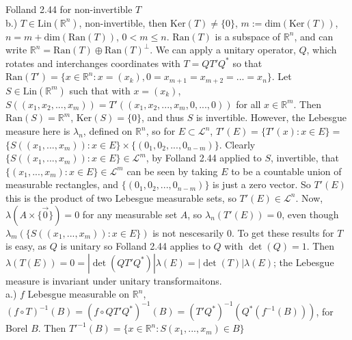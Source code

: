 \documentclass[12pt]{article}
\newcommand{\reals}[0] { \mathbb{R}}
\begin{document}
\begin{flushleft}
Folland 2.44 for non-invertible $T$ \\
b.) $T \in \textrm{Lin}(\reals^n)$, non-invertible, then $\textrm{Ker}(T) \not = \{ 0 \}$, $m := \textrm{dim}(\textrm{Ker}(T))$, $n = m + \textrm{dim}(\textrm{Ran}(T))$, $0 < m \le n$.
$\textrm{Ran}(T)$ is a subspace of $\reals^n$, and can write $\reals^n = \textrm{Ran}(T) \oplus \textrm{Ran}(T) ^ \perp$. We can apply a unitary operator, $Q$, which rotates and interchanges coordinates with $T = QT'Q^*$ so that  $\textrm{Ran}(T') = \{ x \in \reals^n: x= (x_k), 0 = x_{m+1} = x_{m+2} = ... = x_{n} \}$. Let $S \in \textrm{Lin}(\reals^m)$ such that with $x = (x_k)$, $S( (x_1, x_2, ..., x_m)) = T'(( x_1, x_2, ..., x_m, 0, ..., 0 ))$ for all $x \in \reals ^m$. Then $\textrm{Ran}(S) = \reals^m$, $\textrm{Ker}(S) = \{0 \} $, and thus $S$ is invertible. However, the Lebesgue measure here is $\lambda_n$, defined on $\reals^n$, so for $E \subset \mathcal{L}^n$, $T' (E ) =    \{ T'(x): x \in E \}  = $ $  \{ S( (x_1, ..., x_m) ): x \in E \} \times \{ (0_1, 0_2, ..., 0_{n-m})\}$. Clearly $ \{ S( (x_1, ..., x_m) ): x \in E \} \in \mathcal{L}^m$, by Folland 2.44 applied to $S$, invertible, that $ \{ (x_1, ..., x_m) : x \in E\} \in \mathcal{L}^m$ can be seen by taking $E$ to be a countable union of measurable rectangles, and $\{ (0_1, 0_2, ..., 0_{n-m})\}$ is just a zero vector. So $T'(E)$ this is the product of two Lebesgue measurable sets, so $T'(E) \in \mathcal{L}^n$. Now, $\lambda(A \times \{ \vec{0} \}) = 0$ for any measurable set $A$, so $\lambda_n(T'(E)) = 0$, even though $ \lambda_m( \{ S( (x_1, ..., x_m) ): x \in E \} )$ is not nescesarily 0. To get these results for $T$ is easy, as $Q$ is unitary so Folland 2.44 applies to $Q$ with $\det(Q)=1$. Then $ \lambda(T(E)) = 0 = |\det(QT'Q^*)| \lambda(E) = |\det(T)| \lambda(E)$; the Lebesgue measure is invariant under unitary transformaitons.\\
a.) $f$ Lebesgue measurable on $\reals^n$, $(f \circ T )^{-1} (B) = (f \circ Q T' Q^* )^{-1} (B) = (T' Q^* )^{-1} (  Q^*(f^{-1}(B)))$, for Borel $B$. 
Then $ T'^{-1}(B) = \{ x \in \reals^n: S(x_1, ..., x_m) \in B \}$

\end{flushleft}
\end{document}
